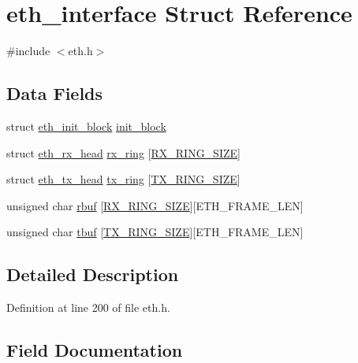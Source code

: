 \hypertarget{structeth__interface}{}\section{eth\+\_\+interface Struct Reference}
\label{structeth__interface}


{\ttfamily \#include $<$eth.\+h$>$}

\subsection*{Data Fields}
\begin{DoxyCompactItemize}
\item 
struct \hyperlink{structeth__init__block}{eth\+\_\+init\+\_\+block} \hyperlink{structeth__interface_a3d5c07d2bbc0d37685f5bb8517fdd743}{init\+\_\+block}
\item 
struct \hyperlink{structeth__rx__head}{eth\+\_\+rx\+\_\+head} \hyperlink{structeth__interface_aa1de1cea990454aa2d1932f1fd37cf8f}{rx\+\_\+ring} \mbox{[}\hyperlink{eth_8h_afcfb8ac36c733187de151348eb50ef01}{R\+X\+\_\+\+R\+I\+N\+G\+\_\+\+S\+I\+ZE}\mbox{]}
\item 
struct \hyperlink{structeth__tx__head}{eth\+\_\+tx\+\_\+head} \hyperlink{structeth__interface_a9fd2c4a1824efd32fbdb0bc85ae42abc}{tx\+\_\+ring} \mbox{[}\hyperlink{eth_8h_a530086d082c22e371518c2497c6d9014}{T\+X\+\_\+\+R\+I\+N\+G\+\_\+\+S\+I\+ZE}\mbox{]}
\item 
unsigned char \hyperlink{structeth__interface_a173aaee97f562414ca50c66cc4c2815c}{rbuf} \mbox{[}\hyperlink{eth_8h_afcfb8ac36c733187de151348eb50ef01}{R\+X\+\_\+\+R\+I\+N\+G\+\_\+\+S\+I\+ZE}\mbox{]}\mbox{[}E\+T\+H\+\_\+\+F\+R\+A\+M\+E\+\_\+\+L\+EN\mbox{]}
\item 
unsigned char \hyperlink{structeth__interface_a5e70e888f7bad2ab4eb06ee4784709e8}{tbuf} \mbox{[}\hyperlink{eth_8h_a530086d082c22e371518c2497c6d9014}{T\+X\+\_\+\+R\+I\+N\+G\+\_\+\+S\+I\+ZE}\mbox{]}\mbox{[}E\+T\+H\+\_\+\+F\+R\+A\+M\+E\+\_\+\+L\+EN\mbox{]}
\end{DoxyCompactItemize}


\subsection{Detailed Description}


Definition at line 200 of file eth.\+h.



\subsection{Field Documentation}
\hypertarget{structeth__interface_a3d5c07d2bbc0d37685f5bb8517fdd743}{}\label{structeth__interface_a3d5c07d2bbc0d37685f5bb8517fdd743} 
